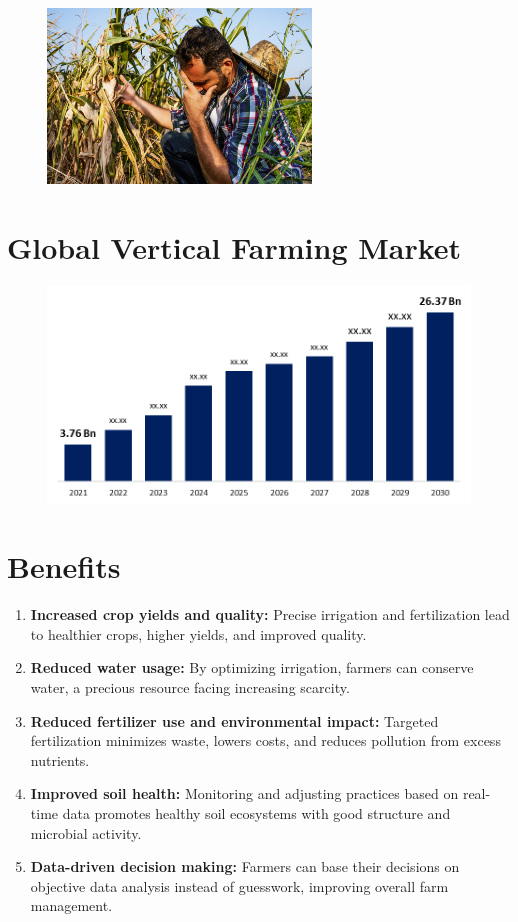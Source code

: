\documentclass{article}
\begin{document}
\begin{figure}[th]
    \centering
    \includegraphics[width=7cm]{received_411749457976133.jpeg}
     \label{fig:enter-label}
\end{figure}
\newpage
\section{Global Vertical Farming Market}
\begin{figure}[th]
    \centering
    \includegraphics[width=12cm]{vertical-farming-market.png}
    \label{fig:enter-label}
\end{figure}
\section{Benefits}
\begin{enumerate}
    \item\textbf{ Increased crop yields and quality:} Precise irrigation and fertilization lead to healthier crops, higher 
yields, and improved quality.
\item\textbf{Reduced water usage: } By optimizing irrigation, farmers can conserve water, a precious resource facing 
increasing scarcity.
\item\textbf{Reduced fertilizer use and environmental impact: }Targeted fertilization minimizes waste, lowers 
costs, and reduces pollution from excess nutrients.
\item\textbf{Improved soil health:} Monitoring and adjusting practices based on real-time data promotes healthy soil 
ecosystems with good structure and microbial activity.
\item\textbf{Data-driven decision making: } Farmers can base their decisions on objective data analysis instead of 
guesswork, improving overall farm management.
\end{enumerate}
\end{document}
